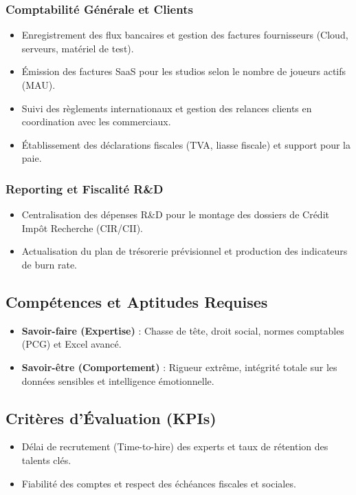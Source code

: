 \documentclass[12pt,a4paper]{article}
\begin{document}
\subsubsection{Comptabilité Générale et Clients}
\begin{itemize}[label=\textbullet]
    \item Enregistrement des flux bancaires et gestion des factures fournisseurs (Cloud, serveurs, matériel de test).
    \item Émission des factures SaaS pour les studios selon le nombre de joueurs actifs (MAU).
    \item Suivi des règlements internationaux et gestion des relances clients en coordination avec les commerciaux.
    \item Établissement des déclarations fiscales (TVA, liasse fiscale) et support pour la paie.
\end{itemize}

\subsubsection{Reporting et Fiscalité R\&D}
\begin{itemize}[label=\textbullet]
    \item Centralisation des dépenses R\&D pour le montage des dossiers de Crédit Impôt Recherche (CIR/CII).
    \item Actualisation du plan de trésorerie prévisionnel et production des indicateurs de burn rate.
\end{itemize}

\subsection{Compétences et Aptitudes Requises}
\begin{itemize}[label=\textbullet]
    \item \textbf{Savoir-faire (Expertise)} : Chasse de tête, droit social, normes comptables (PCG) et Excel avancé.
    \item \textbf{Savoir-être (Comportement)} : Rigueur extrême, intégrité totale sur les données sensibles et intelligence émotionnelle.
\end{itemize}

\subsection{Critères d'Évaluation (KPIs)}
\begin{itemize}[label=\textbullet]
    \item Délai de recrutement (Time-to-hire) des experts et taux de rétention des talents clés.
    \item Fiabilité des comptes et respect des échéances fiscales et sociales.
\end{itemize}
\end{document}
